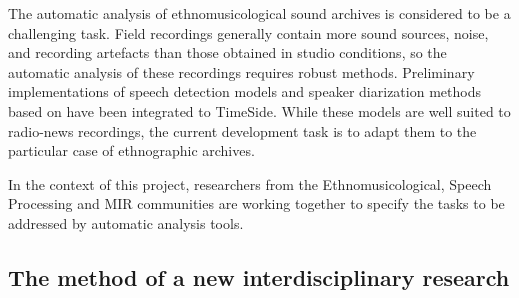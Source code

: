 \documentclass{sig-alternate}
\begin{document}
The automatic analysis of ethnomusicological sound archives is considered to be a challenging task.
Field recordings generally contain more sound sources, noise, and recording artefacts than those obtained in studio conditions, so the automatic analysis of these recordings requires robust methods.
Preliminary implementations  of speech detection models and speaker diarization methods based on \cite{barras2006multistage} have been integrated to TimeSide. 
While these models are well suited to radio-news recordings, the current development task is to adapt them to the particular case of ethnographic archives.

In the context of this project, researchers from the Ethnomusicological, Speech Processing and MIR communities are working together to specify the tasks to be addressed by automatic analysis tools.


\subsection{The method of a new interdisciplinary research}
\end{document}
